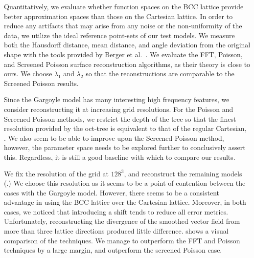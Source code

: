 
Quantitatively, we evaluate whether function spaces on the BCC lattice provide better approximation spaces than those on the Cartesian lattice. In order to reduce any artifacts that may arise from any noise or the non-uniformity of the data, we utilize the ideal reference point-sets of our test models.  We measure both the Hausdorff distance, mean distance, and angle deviation from the original shape with the tools provided by Berger et al.~\cite{reconbench}. We evaluate the FFT, Poisson, and Screened Poisson surface reconstruction algorithms, as their theory is close to ours. We choose $\lambda_1$ and $\lambda_2$ so that the reconstructions are comparable to the Screened Poisson results.

Since the Gargoyle model has many interesting high frequency features, we consider reconstructing it at increasing grid resolutions. For the Poisson and Screened Poisson methods, we restrict the depth of the tree so that the finest resolution provided by the oct-tree is equivalent to that of the regular Cartesian, . We also seem to be able to improve upon the Screened Poisson method, however, the parameter space needs to be explored further to conclusively assert this. Regardless, it is still a good baseline with which to compare our results. 

We fix the resolution of the grid at $128^3$, and reconstruct the remaining models (.) We choose this resolution as it seems to be a point of contention between the cases with the Gargoyle model. However, there seems to be a consistent advantage in using the BCC lattice over the Cartesian lattice. Moreover, in both cases, we noticed that introducing a shift tends to reduce all error metrics. Unfortunately, reconstructing the divergence of the smoothed vector field from more than three lattice directions produced little difference.  shows a visual comparison of the techniques. We manage to outperform the FFT and Poisson techniques by a large margin, and outperform the screened Poisson case.

